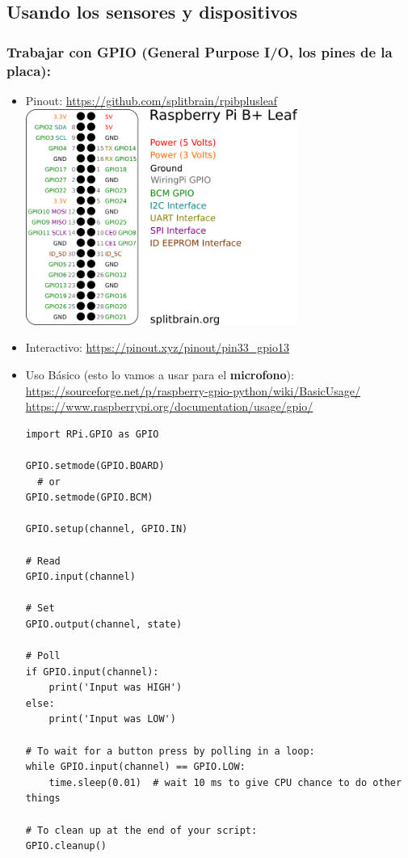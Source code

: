 \subsection{Usando los sensores y
dispositivos}\label{usando-los-sensores-y-dispositivos}

\subsubsection{Trabajar con \textbf{GPIO} (General Purpose I/O, los
pines de la
placa):}\label{trabajar-con-gpio-general-purpose-io-los-pines-de-la-placa}

\begin{itemize}
\item
  Pinout:
  \url{https://github.com/splitbrain/rpibplusleaf}\\
\includegraphics[width=0.7\textwidth,keepaspectratio]{img/pinout.png}
\item
  Interactivo: \url{https://pinout.xyz/pinout/pin33_gpio13}\\
\item
  Uso Básico (esto lo vamos a usar para el \textbf{microfono}):\\
  \url{https://sourceforge.net/p/raspberry-gpio-python/wiki/BasicUsage/}\\
  \url{https://www.raspberrypi.org/documentation/usage/gpio/}\\
  \begin{Verbatim}[breaklines=true, breakanywhere=true]
import RPi.GPIO as GPIO

GPIO.setmode(GPIO.BOARD)
  # or
GPIO.setmode(GPIO.BCM)

GPIO.setup(channel, GPIO.IN)

# Read
GPIO.input(channel)

# Set
GPIO.output(channel, state)

# Poll
if GPIO.input(channel):
    print('Input was HIGH')
else:
    print('Input was LOW')

# To wait for a button press by polling in a loop:
while GPIO.input(channel) == GPIO.LOW:
    time.sleep(0.01)  # wait 10 ms to give CPU chance to do other things

# To clean up at the end of your script:
GPIO.cleanup()
\end{Verbatim}
\end{itemize}

